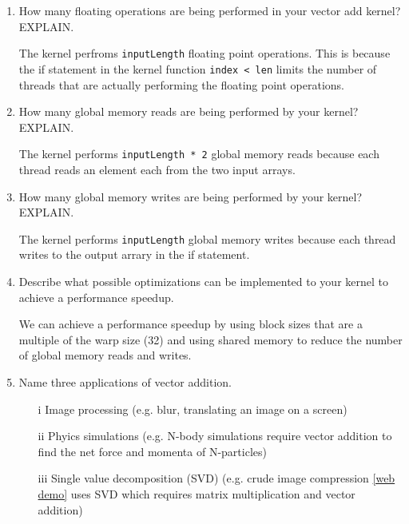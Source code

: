 \documentclass[../main.tex]{subfiles}
\begin{document}
\begin{enumerate}
    \item How many floating operations are being performed in your vector add
    kernel? EXPLAIN.

    The kernel perfroms \texttt{inputLength} floating point operations. This is because
    the if statement in the kernel function \texttt{index < len} limits the number of threads that
    are actually performing the floating point operations.

    \item How many global memory reads are being performed by your kernel?
    EXPLAIN.

    The kernel performs \texttt{inputLength * 2} global memory reads because each thread
    reads an element each from the two input arrays.
    
    \item How many global memory writes are being performed by your kernel?
    EXPLAIN.
    
    The kernel performs \texttt{inputLength} global memory writes because each thread writes 
    to the output arrary in the if statement.

    \item Describe what possible optimizations can be implemented to your kernel
    to achieve a performance speedup.

    We can achieve a performance speedup by using block sizes that are a multiple of the warp size
    (32) and using shared memory to reduce the number of global memory reads and writes.
    
    \item Name three applications of vector addition.
    
    \begin{enumerate}
        \item [i] Image processing (e.g. blur, translating an image on a screen)
        \item [ii] Phyics simulations (e.g. N-body simulations require vector addition to find the net
            force and momenta of N-particles)
        \item [iii] Single value decomposition (SVD) (e.g. crude image compression
        \href{https://timbaumann.info/svd-image-compression-demo/}{[web demo]} uses SVD which
        requires matrix multiplication and vector addition)
    \end{enumerate}
\end{enumerate}
\end{document}

